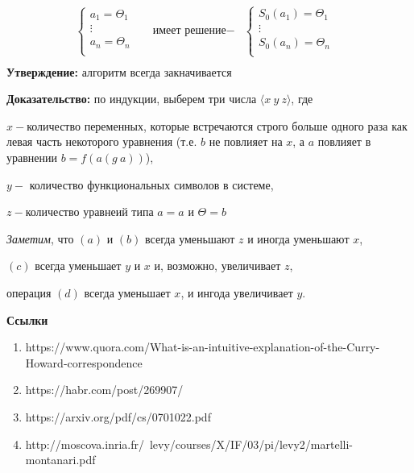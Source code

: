 \documentclass[12pt, a4paper]{article}
\begin{document}
	\begin{align*}
		\begin{cases}			
			a_1=\Theta_1&\\
			\vdots&\\
			a_n=\Theta_n&\\
		\end{cases} & \text{имеет решение}-&\begin{cases}			
			S_0(a_1)=\Theta_1&\\
			\vdots&\\
			S_0(a_n)=\Theta_n&\\
		\end{cases}\\
	\end{align*}
	\textbf{Утверждение:} алгоритм всегда закначивается\par
	\textbf{Доказательство:} по индукции, выберем три числа $ \big \langle x\:y\:z\big \rangle$, где\par $x-$количество переменных, которые встречаются строго больше одного раза как левая часть некоторого уравнения (т.е. $b$ не повлияет на $x$, а $a$ повлияет в уравнении $b=f(a(g\:a))$),\par $y-$ количество функциональных символов в системе,\par $z-$количество уравнеий типа $a=a$ и $\Theta=b$ \par
		\textit{Заметим}, что $(a)$ и $(b)$ всегда уменьшают $z$ и иногда уменьшают $x$,\par $(c)$ всегда уменьшает $y$ и $x$ и, возможно, увеличивает $z$,\par операция $(d)$ всегда уменьшает $x$, и ингода увеличивает $y$.
		
		
		
		
\par \textbf{Ссылки}
\begin{enumerate}
\item https://www.quora.com/What-is-an-intuitive-explanation-of-the-Curry-Howard-correspondence
\item https://habr.com/post/269907/
\item https://arxiv.org/pdf/cs/0701022.pdf
\item http://moscova.inria.fr/~levy/courses/X/IF/03/pi/levy2/martelli-montanari.pdf
\end{enumerate}
\end{document}
